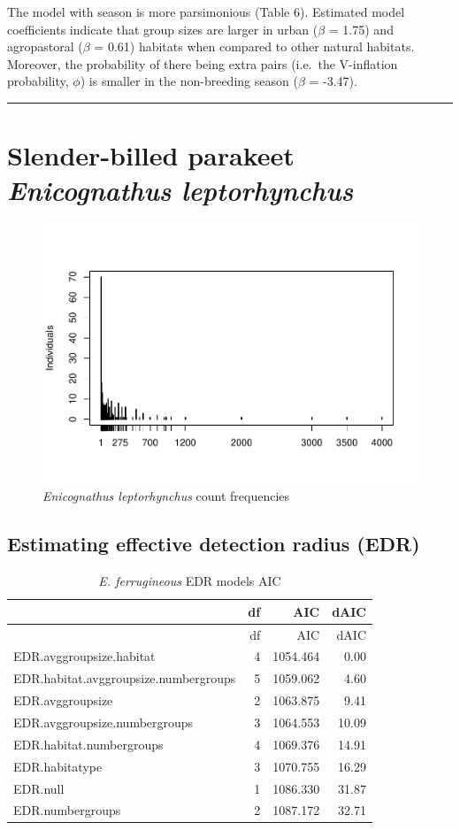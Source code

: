 \documentclass[]{article}
\begin{document}
The model with season is more parsimonious (Table 6). Estimated model
coefficients indicate that group sizes are larger in urban (\(\beta\) =
1.75) and agropastoral (\(\beta\) = 0.61) habitats when compared to
other natural habitats. Moreover, the probability of there being extra
pairs (i.e.~the V-inflation probability, \(\phi\)) is smaller in the
non-breeding season (\(\beta\) = -3.47).

\begin{center}\rule{0.5\linewidth}{\linethickness}\end{center}

\section{\texorpdfstring{Slender-billed parakeet \emph{Enicognathus
leptorhynchus}}{Slender-billed parakeet Enicognathus leptorhynchus}}\label{slender-billed-parakeet-enicognathus-leptorhynchus}

\begin{figure}[H]
\includegraphics{Patagonia_parrots_density_analysis_files/figure-latex/unnamed-chunk-15-1} \caption{\textit{Enicognathus leptorhynchus} count frequencies}\label{fig:unnamed-chunk-15}
\end{figure}

\subsection{Estimating effective detection radius
(EDR)}\label{estimating-effective-detection-radius-edr-1}

\begin{longtable}[]{@{}lrrr@{}}
\caption{\textit{E. ferrugineous} EDR models AIC}\tabularnewline
\toprule
& df & AIC & dAIC\tabularnewline
\midrule
\endfirsthead
\toprule
& df & AIC & dAIC\tabularnewline
\midrule
\endhead
EDR.avggroupsize.habitat & 4 & 1054.464 & 0.00\tabularnewline
EDR.habitat.avggroupsize.numbergroups & 5 & 1059.062 &
4.60\tabularnewline
EDR.avggroupsize & 2 & 1063.875 & 9.41\tabularnewline
EDR.avggroupsize.numbergroups & 3 & 1064.553 & 10.09\tabularnewline
EDR.habitat.numbergroups & 4 & 1069.376 & 14.91\tabularnewline
EDR.habitatype & 3 & 1070.755 & 16.29\tabularnewline
EDR.null & 1 & 1086.330 & 31.87\tabularnewline
EDR.numbergroups & 2 & 1087.172 & 32.71\tabularnewline
\bottomrule
\end{longtable}
\end{document}
